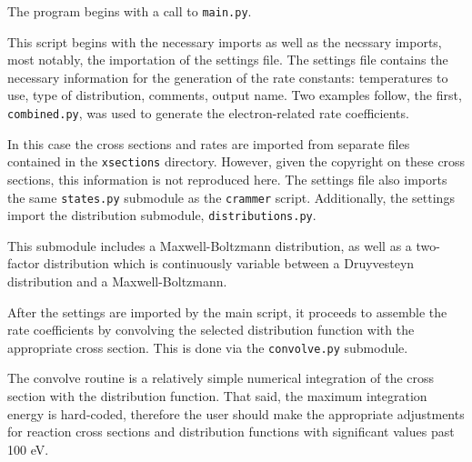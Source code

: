 {
}

The program begins with a call to \texttt{main.py}.
\begin{singlespace}
  
\end{singlespace}
This script begins with the necessary imports as well as the necssary imports,
most notably, the importation of the settings file. The settings file contains
the necessary information for the generation of the rate constants: temperatures
to use, type of distribution, comments, output name. Two examples follow, the
first, \texttt{combined.py}, was used to generate the electron-related rate
coefficients.
\begin{singlespace}
  
\end{singlespace}
In this case the cross sections and rates are imported from separate files
contained in the \texttt{xsections} directory. However, given the copyright on
these cross sections, this information is not reproduced here. The settings file
also imports the same \texttt{states.py} submodule as the \texttt{crammer}
script. Additionally, the settings import the distribution submodule,
\texttt{distributions.py}.
\begin{singlespace}
  
\end{singlespace}
This submodule includes a Maxwell-Boltzmann distribution, as well as a
two-factor distribution which is continuously variable between a Druyvesteyn
distribution and a Maxwell-Boltzmann.

After the settings are imported by the main script, it proceeds to assemble the
rate coefficients by convolving the selected distribution function with the
appropriate cross section. This is done via the \texttt{convolve.py} submodule.
\begin{singlespace}
  
\end{singlespace}
The convolve routine is a relatively simple numerical integration of the cross
section with the distribution function. That said, the maximum integration
energy is hard-coded, therefore the user should make the appropriate adjustments
for reaction cross sections and distribution functions with significant values
past 100 eV.
